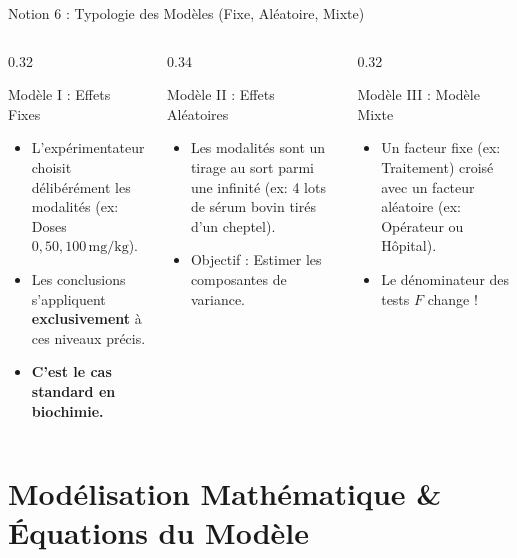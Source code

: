 \documentclass[aspectratio=169,10pt]{beamer}
\begin{document}
\begin{frame}{Notion 6 : Typologie des Modèles (Fixe, Aléatoire, Mixte)}
  \begin{columns}[onlytextwidth, T]
    \begin{column}{0.32\linewidth}
      \begin{conceptbox}{Modèle I : Effets Fixes}
        \begin{itemize}
          \item L'expérimentateur choisit délibérément les modalités (ex: Doses $0, 50, 100\,\text{mg/kg}$).
          \item Les conclusions s'appliquent \textbf{exclusivement} à ces niveaux précis.
          \item \textbf{C'est le cas standard en biochimie.}
        \end{itemize}
      \end{conceptbox}
    \end{column}
    \begin{column}{0.34\linewidth}
      \begin{conceptbox}{Modèle II : Effets Aléatoires}
        \begin{itemize}
          \item Les modalités sont un tirage au sort parmi une infinité (ex: 4 lots de sérum bovin tirés d'un cheptel).
          \item Objectif : Estimer les composantes de variance.
        \end{itemize}
      \end{conceptbox}
    \end{column}
    \begin{column}{0.32\linewidth}
      \begin{conceptbox}{Modèle III : Modèle Mixte}
        \begin{itemize}
          \item Un facteur fixe (ex: Traitement) croisé avec un facteur aléatoire (ex: Opérateur ou Hôpital).
          \item Le dénominateur des tests $F$ change !
        \end{itemize}
      \end{conceptbox}
    \end{column}
  \end{columns}
\end{frame}

\section{Modélisation Mathématique \& Équations du Modèle}
\end{document}
